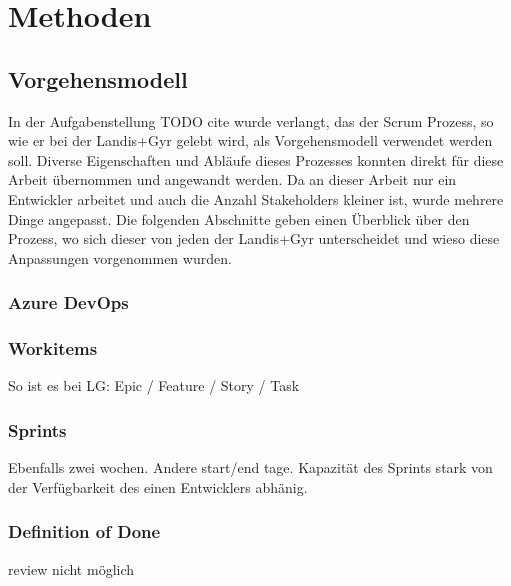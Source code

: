 \chapter{Methoden}





\section{Vorgehensmodell}
In der Aufgabenstellung TODO cite wurde verlangt, das der Scrum Prozess, so wie er bei der Landis+Gyr gelebt wird, als Vorgehensmodell verwendet werden soll.
Diverse Eigenschaften und Abläufe dieses Prozesses konnten direkt für diese Arbeit übernommen und angewandt werden.
Da an dieser Arbeit nur ein Entwickler arbeitet und auch die Anzahl Stakeholders kleiner ist, wurde mehrere Dinge angepasst.
Die folgenden Abschnitte geben einen Überblick über den Prozess, wo sich dieser von jeden der Landis+Gyr unterscheidet und wieso diese Anpassungen vorgenommen wurden.

\subsection{Azure DevOps}

\subsection{Workitems}
So ist es bei LG:
Epic / Feature / Story / Task


\subsection{Sprints}
Ebenfalls zwei wochen. Andere start/end tage.
Kapazität des Sprints stark von der Verfügbarkeit des einen Entwicklers abhänig.


\subsection{Definition of Done}
review nicht möglich